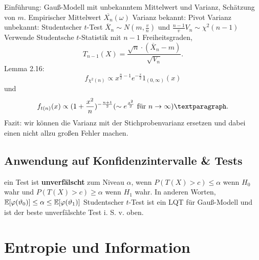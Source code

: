 \begin{outline}
    \1 Einführung: Gauß-Modell mit unbekanntem Mittelwert und Varianz, Schätzung von $m$.
        \2 Empirischer Mittelwert $\overline{X_n}(\omega)$
        \2 Varianz bekannt: Pivot
        \2 Varianz unbekannt: Studentscher $t$-Test
    \1 $\overline{X}_n\sim N(m,\frac{v}{n})$ und $\frac{n-1}{v}V_n \sim \chi^2(n-1)$
    \1 Verwende Studentsche $t$-Statistik mit $n-1$ Freiheitsgraden, $$T_{n-1}(X)=\frac{\sqrt{n}\cdot (\overline{X}_n - m)}{\sqrt{V_n}}.$$
    \1 Lemma 2.16: $$f_{\chi^2(n)}\propto x^{\frac{n}{2}-1}e^{-\frac{x}{2}} 1_{(0,\infty)}(x)$$ 
    und 
    $$f_{t(n)}(x) \propto (1+\frac{x^2}{n})^{-\frac{n+1}{2}} (\sim e^{\frac{x^2}{2}} \text{ für } n\ra \infty)¶.$$
\0 Fazit: wir können die Varianz mit der Stichprobenvarianz ersetzen und dabei einen nicht allzu großen Fehler machen. 

\subsection{Anwendung auf Konfidenzintervalle \& Tests}
    \1 ein Test ist \textbf{unverfälscht} zum Niveau $\alpha$, wenn $P(T(X)>c) \leq \alpha$ wenn $H_0$ wahr und $P(T(X)>c) \geq \alpha$ wenn $H_1$ wahr. In anderen Worten, $\mathbb{E}\hspace{-2pt}\left[{\varphi(\vartheta_0)}\right]\leq \alpha \leq \mathbb{E}\hspace{-2pt}\left[{\varphi(\vartheta_1)}\right]$
    \1 Studentscher $t$-Test ist ein LQT für Gauß-Modell und ist der beste unverfälschte Test i. S. v. oben.
\end{outline}

\newpage

\section{Entropie und Information}

